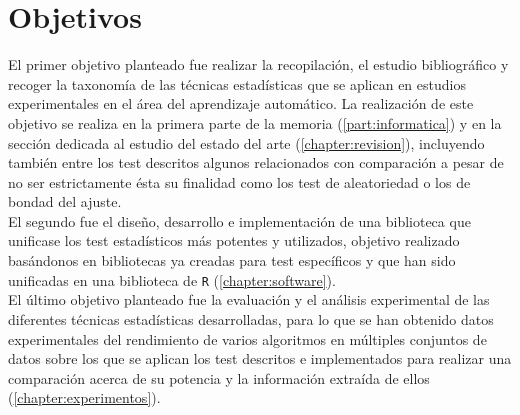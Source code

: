 \chapter*{Objetivos}

	El primer objetivo planteado fue realizar la 
recopilación, el estudio bibliográfico y recoger la 
taxonomía de las técnicas estadísticas que se aplican
en estudios experimentales en el área del aprendizaje
automático. La realización de este objetivo se realiza
en la primera parte de la memoria (\ref{part:informatica}) y
en la sección dedicada al estudio del estado del arte 
(\ref{chapter:revision}), incluyendo también entre los
test descritos algunos relacionados con comparación a
pesar de no ser estrictamente ésta su finalidad
como los test de aleatoriedad o los de bondad del 
ajuste.\\
	El segundo fue el diseño, desarrollo
e implementación de una biblioteca que unificase los test
estadísticos más potentes y utilizados, objetivo 
realizado basándonos en bibliotecas ya creadas para 
test específicos y que han sido unificadas en una biblioteca
de \texttt{R} (\ref{chapter:software}).\\
	El último objetivo planteado fue la evaluación y el 
análisis experimental de las diferentes técnicas estadísticas 
desarrolladas, para lo que se han obtenido datos 
experimentales del rendimiento de varios algoritmos en 
múltiples conjuntos de  datos sobre los que se aplican los 
test descritos e implementados para realizar una comparación 
acerca de su potencia y la información extraída de ellos
(\ref{chapter:experimentos}).



	

